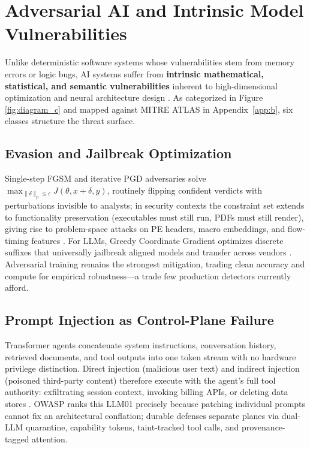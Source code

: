 \documentclass[conference,10pt,twocolumn,a4paper]{IEEEtran}
\begin{document}
\section{Adversarial AI and Intrinsic Model Vulnerabilities}
\label{sec:adversarial_ai}
Unlike deterministic software systems whose vulnerabilities stem from memory errors or logic bugs, AI systems suffer from \textbf{intrinsic mathematical, statistical, and semantic vulnerabilities} inherent to high-dimensional optimization and neural architecture design \cite{nist_sp_ai_100_2e2025, goodfellow2015explaining, carlini2017towards}. As categorized in Figure \ref{fig:diagram_c} and mapped against MITRE ATLAS in Appendix~\ref{app:b}, six classes structure the threat surface.

\subsection{Evasion and Jailbreak Optimization}
Single-step FGSM and iterative PGD adversaries solve $\max_{\|\delta\|_p \le \epsilon} J(\theta, x+\delta, y)$, routinely flipping confident verdicts with perturbations invisible to analysts; in security contexts the constraint set extends to functionality preservation (executables must still run, PDFs must still render), giving rise to problem-space attacks on PE headers, macro embeddings, and flow-timing features \cite{szegedy2014intriguing, goodfellow2015explaining, carlini2017towards}. For LLMs, Greedy Coordinate Gradient optimizes discrete suffixes that universally jailbreak aligned models and transfer across vendors \cite{zou2023universal}. Adversarial training remains the strongest mitigation, trading clean accuracy and compute for empirical robustness---a trade few production detectors currently afford.

\subsection{Prompt Injection as Control-Plane Failure}
Transformer agents concatenate system instructions, conversation history, retrieved documents, and tool outputs into one token stream with no hardware privilege distinction. Direct injection (malicious user text) and indirect injection (poisoned third-party content) therefore execute with the agent's full tool authority: exfiltrating session context, invoking billing APIs, or deleting data stores \cite{greshake2023indirect, xiang2026post, hines2026securing}. OWASP ranks this LLM01 precisely because patching individual prompts cannot fix an architectural conflation; durable defenses separate planes via dual-LLM quarantine, capability tokens, taint-tracked tool calls, and provenance-tagged attention.
\end{document}
